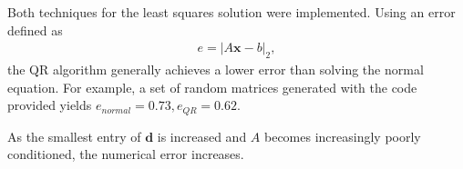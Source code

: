 \documentclass[10pt]{article}
\renewcommand{\vec}{\textbf}
\begin{document}
Both techniques for the least squares solution were implemented. Using an error defined as \begin{align*}
    e = |A\vec{x}-b|_2,
\end{align*} the QR algorithm generally achieves a lower error than solving the normal equation. For example, a set of random matrices generated with the code provided yields \(e_{normal} = 0.73, e_{QR} = 0.62\).

As the smallest entry of \(\vec{d}\) is increased and \(A\) becomes increasingly poorly conditioned, the numerical error increases.

{\small }
\end{document}
